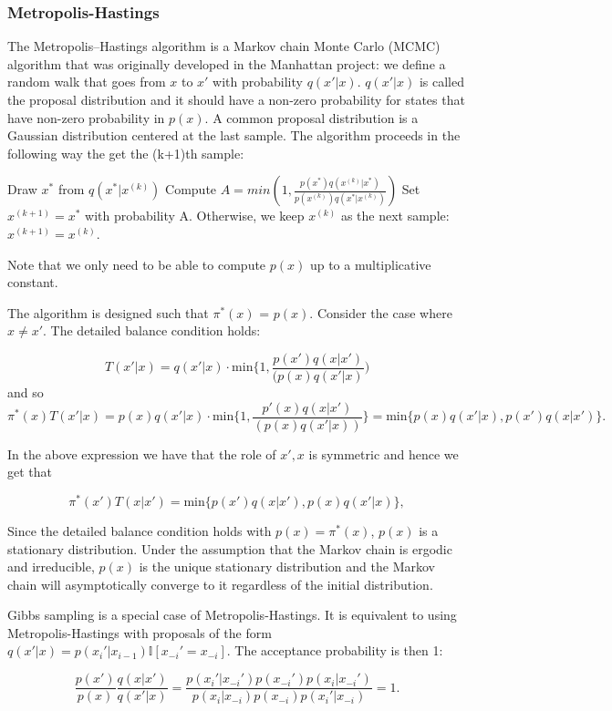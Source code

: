 \documentclass{article}
\begin{document}
\subsubsection{Metropolis-Hastings}

The Metropolis–Hastings algorithm is a Markov chain Monte Carlo (MCMC) algorithm that was originally developed in the Manhattan project: we define a random walk that goes from $x$ to $x'$ with probability $q(x'|x)$. 
$q(x'|x)$ is called the proposal distribution and it should have a non-zero probability for states that have non-zero probability in $p(x)$. A common proposal distribution is a Gaussian distribution centered at the last sample. The algorithm proceeds in the following way the get the (k+1)th sample: \smallskip

\begin{algorithmic}
    \State Draw $x^*$ from $q(x^*|x^{(k)})$
    \State Compute $A = min(1, \frac{p(x^*)q(x^{(k)}|x^*)}{p(x^{(k)}) q(x^*|x^{(k)})} )$
    \State Set $x^{(k+1)} = x^* $ with probability A. Otherwise, we keep $x^{(k)}$ as the next sample: $x^{(k+1)} =x^{(k)} $.
\EndWhile
\end{algorithmic}

Note that we only need to be able to compute $p(x)$ up to a multiplicative constant.  \smallskip  \smallskip
 
The algorithm is designed such that $\pi^*(x)$ = $p(x)$.  Consider the case where $x \neq x'$. The detailed balance condition holds:

    $$ T(x'|x) = q(x'|x) \cdot \mathrm{min}\{1,\frac{p(x')q(x|x')}{( p(x) q(x'|x)})$$
and so   
    \[  \pi^*(x) T(x'|x) = p(x) q(x'|x) \cdot \mathrm{min}\{1, \frac{p'(x) q(x|x')}{ ( p(x) q(x'|x))} \} = \mathrm{min}\{ p(x) q(x'|x), p(x') q(x|x') \}.\]
    
    In the above expression we have that the role of $x',x$ is symmetric and hence we get that 
    
        \[  \pi^*(x') T(x|x') = \mathrm{min}\{ p(x') q(x|x'), p(x) q(x'|x)\}, \]

Since the detailed balance condition holds with $p(x) = \pi^*(x)$, $p(x)$ is a stationary distribution. Under the assumption that the Markov chain is ergodic and irreducible, $p(x)$ is the unique stationary distribution and the Markov chain will asymptotically converge to it regardless of the initial distribution. \smallskip \smallskip


Gibbs sampling is a special case of Metropolis-Hastings.  It is equivalent to using Metropolis-Hastings with proposals of the form  $q(x'|x) = p(x_i'|x_{i-1}) \mathbb{I}[x_{-i}' = x_{-i}]$. The acceptance probability is then 1:

    $$ \frac{p(x')}{p(x)}\frac{q(x|x')}{q(x'|x)} 
    = \frac{p(x_i'| x_{-i}') p(x_{-i}')p(x_i|x_{-i}')}{p(x_i|x_{-i}) p(x_{-i}) p(x_i'|x_{-i})}
    = 1.  $$
    
\end{document}

